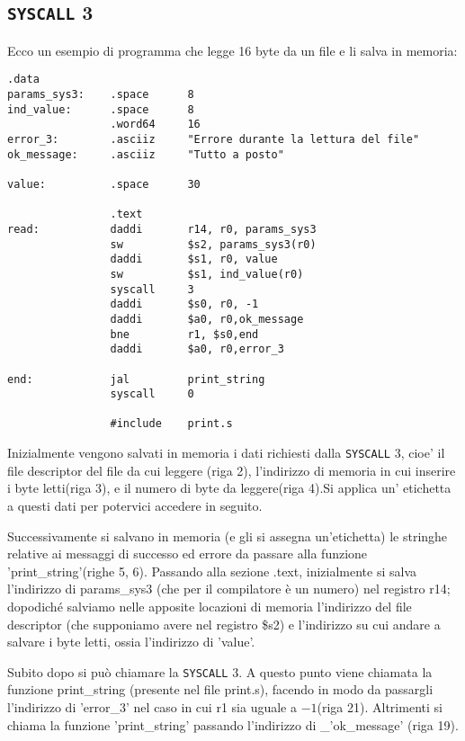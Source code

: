 \documentclass[12pt]{report}
\newcommand{\SC}{\texttt{SYSCALL}}
\begin{document}
\subsection{\SC{} 3}
Ecco un esempio di programma che legge 16 byte da un file e li salva in memoria:
\begin{lstlisting}[caption={Esempio \SC{} 3}, label={code:syscall3}, style={mips}]
                .data
params_sys3:    .space      8                
ind_value:      .space      8            
                .word64     16        
error_3:        .asciiz     "Errore durante la lettura del file"    
ok_message:     .asciiz     "Tutto a posto"    

value:          .space      30                    

                .text
read:           daddi       r14, r0, params_sys3 
                sw          $s2, params_sys3(r0)
                daddi       $s1, r0, value            
                sw          $s1, ind_value(r0)            
                syscall     3            
                daddi       $s0, r0, -1            
                daddi       $a0, r0,ok_message            
                bne         r1, $s0,end            
                daddi       $a0, r0,error_3

end:            jal         print_string
                syscall     0
        
                #include    print.s 
\end{lstlisting}

Inizialmente vengono salvati in memoria i dati richiesti dalla \SC{} 3, cioe' il
file descriptor del file da cui leggere (riga 2), l'indirizzo di memoria in cui
inserire i byte letti(riga 3), e il numero di byte da leggere(riga 4).Si applica
un' etichetta a questi dati per potervici accedere in seguito.

Successivamente si salvano in memoria (e gli si assegna un'etichetta) le stringhe
relative ai messaggi di successo ed errore da passare alla funzione
'print\_string'(righe 5, 6). Passando alla sezione .text, inizialmente si salva
l'indirizzo di params\_sys3 (che per il compilatore \`{e} un numero) nel
registro r14; dopodich\'{e} salviamo nelle apposite locazioni di memoria
l'indirizzo del file descriptor (che supponiamo avere nel registro \$s2) e
l'indirizzo su cui andare a salvare i byte letti, ossia l'indirizzo di 'value'.

Subito dopo si pu\`{o} chiamare la \SC{} 3. A questo  punto viene chiamata la
funzione print\_string (presente nel file print.s), facendo in modo da passargli
l'indirizzo di 'error\_3' nel caso in cui r1 sia uguale a $-1$(riga 21).
Altrimenti si chiama la funzione 'print\_string' passando l'indirizzo di
\_'ok\_message' (riga 19).
\end{document}
